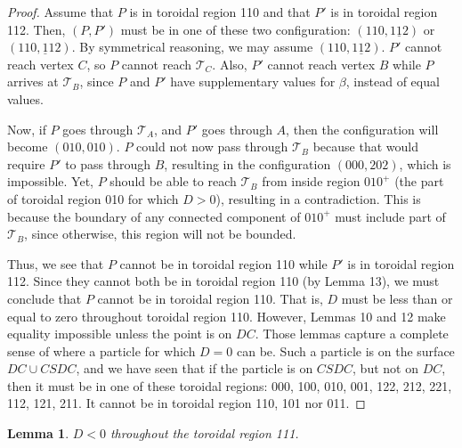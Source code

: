 \documentclass[a4paper, twoside]{article}
\newtheorem{lemma}{Lemma}
\begin{document}
\begin{proof}

Assume that $P$ is in toroidal region 110 and that $P'$ is in toroidal region 112. Then, $(P, P')$ must be in one of these two configuration: $(110, 1\underline{1}2)$ or $(110, \underline{1}12)$. By symmetrical reasoning, we may assume $(110, 1\underline{1}2)$. $P'$ cannot reach vertex $C$, so $P$ cannot reach $\mathcal{T}_C$. Also, $P'$ cannot reach vertex $B$ while $P$ arrives at $\mathcal{T}_B$, since $P$ and $P'$ have supplementary values for $\beta$, instead of equal values. 

Now, if $P$ goes through $\mathcal{T}_A$, and $P'$ goes through $A$, then the configuration will become $(010, 010)$. $P$ could not now pass through $\mathcal{T}_B$ because that would require $P'$ to pass through $B$, resulting in the configuration $(000, 202)$, which is impossible. Yet, $P$ should be able to reach $\mathcal{T}_B$ from inside region $010^+$ (the part of toroidal region 010 for which $D > 0$), resulting in a contradiction. This is because the boundary of 
any connected component of $010^+$ must include part of $\mathcal{T}_B$, since otherwise, this region will not be bounded. 

Thus, we see that $P$ cannot be in toroidal region 110 while $P'$ is in toroidal region 112. Since they cannot both be in toroidal region 110 (by Lemma 13), we must conclude that $P$ cannot be in toroidal region 110. That is, $D$ must be less than or equal to zero throughout toroidal region 110. However, Lemmas 10 and 12 make equality impossible unless the point is on $DC$. Those lemmas capture a complete sense of where a particle for which $D = 0$ can be. Such a particle is on the surface $DC \cup CSDC$, and we have seen that if the particle is on $CSDC$, but not on $DC$, then it must be in one of these toroidal regions: 000, 100, 010, 001, 122, 212, 221, 112, 121, 211. It cannot be in toroidal region 110, 101 nor 011.

\end{proof}

\vspace{2mm}

\begin{lemma}

$D < 0$ throughout the toroidal region 111. 

\end{lemma}
\end{document}
